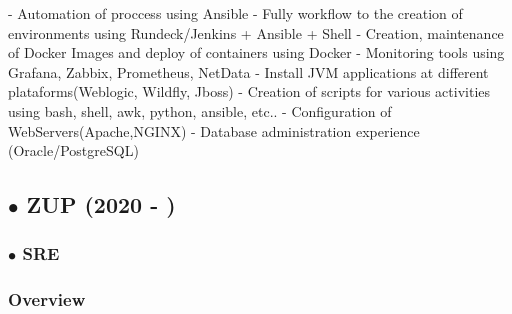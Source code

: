 \documentclass{article}
\begin{document}
- Automation of proccess using Ansible \newline
- Fully workflow to the creation of environments using Rundeck/Jenkins + Ansible + Shell \newline
- Creation, maintenance of Docker Images and deploy of containers using Docker \newline
- Monitoring tools using Grafana, Zabbix, Prometheus, NetData \newline
- Install JVM applications at different plataforms(Weblogic, Wildfly, Jboss) \newline
- Creation of scripts for various activities using bash, shell, awk, python, ansible, etc.. \newline
- Configuration of WebServers(Apache,NGINX) \newline
- Database administration experience (Oracle/PostgreSQL) \newline

\subsection{$\bullet$ ZUP (2020 - )}

\subsubsection{$\bullet$ SRE}

\subsubsection{Overview \\}
\end{document}
